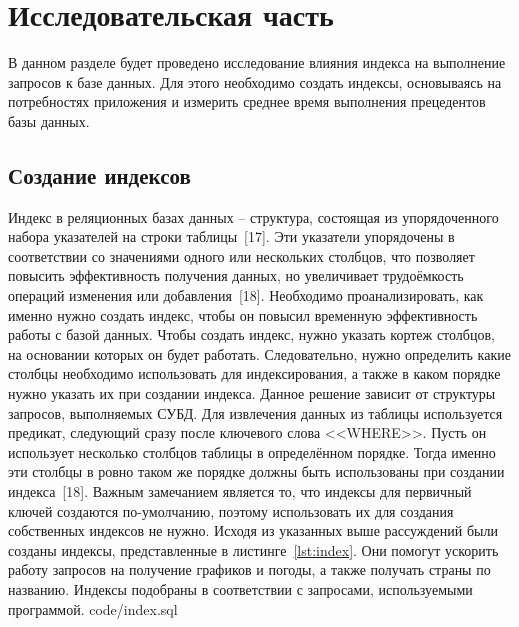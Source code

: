 \chapter{Исследовательская часть}
В данном разделе будет проведено исследование влияния индекса на выполнение запросов к базе данных.
Для этого необходимо создать индексы, основываясь на потребностях приложения и измерить среднее время выполнения прецедентов базы данных.

\section{Создание индексов}
Индекс в реляционных базах данных -- структура, состоящая из упорядоченного набора указателей на строки таблицы~[17].
Эти указатели упорядочены в соответствии со значениями одного или нескольких столбцов, что позволяет повысить эффективность получения данных, но увеличивает трудоёмкость операций изменения или добавления~[18].
Необходимо проанализировать, как именно нужно создать индекс, чтобы он повысил временную эффективность работы с базой данных.
Чтобы создать индекс, нужно указать кортеж столбцов, на основании которых он будет работать.
Следовательно, нужно определить какие столбцы необходимо использовать для индексирования, а также в каком порядке нужно указать их при создании индекса.
Данное решение зависит от структуры запросов, выполняемых СУБД.
Для извлечения данных из таблицы используется предикат, следующий сразу после ключевого слова <<WHERE>>.
Пусть он использует несколько столбцов таблицы в определённом порядке.
Тогда именно эти столбцы в ровно таком же порядке должны быть использованы при создании индекса~[18].
Важным замечанием является то, что индексы для первичный ключей создаются по-умолчанию, поэтому использовать их для создания собственных индексов не нужно.
Исходя из указанных выше рассуждений были созданы индексы, представленные в листинге~\ref{lst:index}.
Они помогут ускорить работу запросов на получение графиков и погоды, а также получать страны по названию.
Индексы подобраны в соответствии с запросами, используемыми программой.
  {code/index.sql}


